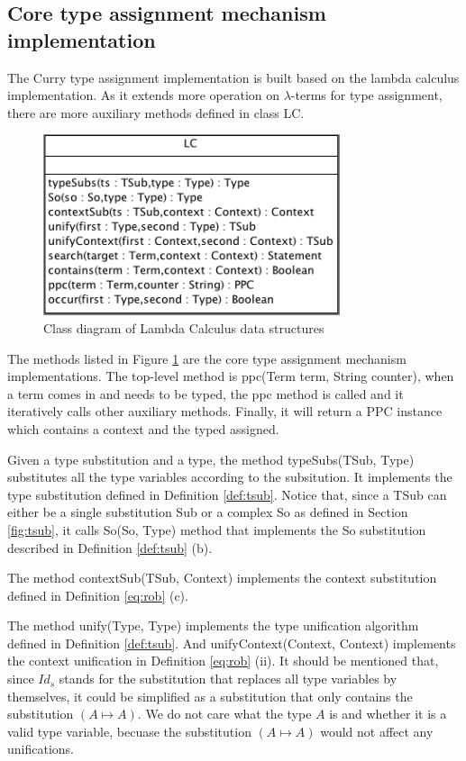 \subsection{Core type assignment mechanism implementation}

The Curry type assignment implementation is built based on the lambda calculus implementation. As it extends more operation on $\lambda$-terms for type assignment, there are more auxiliary methods defined in class \textsf{LC}. 

\begin{figure}[ht]
\centering
\includegraphics[scale=0.6]{pics/LCType}
\caption{Class diagram of Lambda Calculus data structures}
\label{fig:lctype}
\end{figure}


The methods listed in Figure \ref{fig:lctype} are the core type assignment mechanism implementations. The top-level method is \textsf{ppc(Term term, String counter)}, when a term comes in and needs to be typed, the ppc method is called and it iteratively calls other auxiliary methods. Finally, it will return a \textsf{PPC} instance which contains a context and the typed assigned. 

Given a type substitution and a type, the method \textsf{typeSubs(TSub, Type)} substitutes all the type variables according to the subsitution. It implements the type substitution defined in Definition \ref{def:tsub}. Notice that, since a \textsf{TSub} can either be a single substitution \textsf{Sub} or a complex \textsf{So} as defined in Section \ref{fig:tsub}, it calls \textsf{So(So, Type)} method that implements the \textsf{So} substitution described in Definition \ref{def:tsub} (b). 

The method \textsf{contextSub(TSub, Context)} implements the context substitution defined in Definition \ref{eq:rob} (c). 

The method \textsf{unify(Type, Type)} implements the type unification algorithm defined in Definition \ref{def:tsub}. And \textsf{unifyContext(Context, Context)} implements the context unification in Definition \ref{eq:rob} (ii). It should be mentioned that, since $Id_s$ stands for the substitution that replaces all type variables by themselves, it could be simplified as a substitution that only contains the substitution $(A\mapsto A)$. We do not care what the type $A$ is and whether it is a valid type variable, becuase the substitution $(A\mapsto A)$ would not affect any unifications. 

